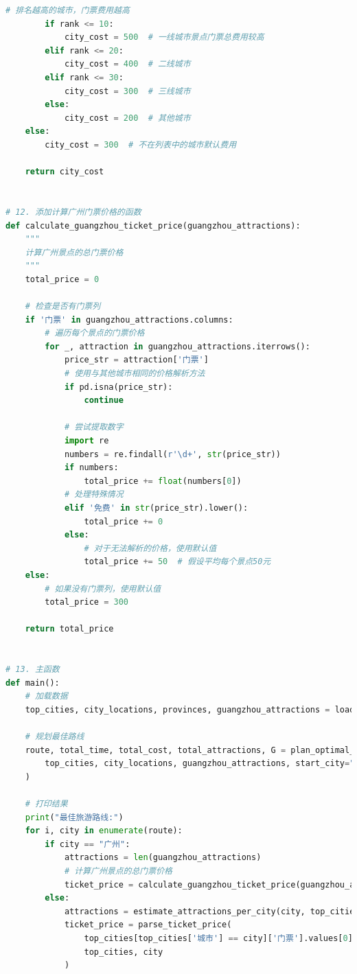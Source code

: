 \documentclass[withoutpreface,bwprint]{cumcmthesis} %
\begin{document}
\begin{appendices}
\begin{lstlisting}[language=python]
        # 排名越高的城市，门票费用越高
        if rank <= 10:
            city_cost = 500  # 一线城市景点门票总费用较高
        elif rank <= 20:
            city_cost = 400  # 二线城市
        elif rank <= 30:
            city_cost = 300  # 三线城市
        else:
            city_cost = 200  # 其他城市
    else:
        city_cost = 300  # 不在列表中的城市默认费用
    
    return city_cost


# 12. 添加计算广州门票价格的函数
def calculate_guangzhou_ticket_price(guangzhou_attractions):
    """
    计算广州景点的总门票价格
    """
    total_price = 0
    
    # 检查是否有门票列
    if '门票' in guangzhou_attractions.columns:
        # 遍历每个景点的门票价格
        for _, attraction in guangzhou_attractions.iterrows():
            price_str = attraction['门票']
            # 使用与其他城市相同的价格解析方法
            if pd.isna(price_str):
                continue
            
            # 尝试提取数字
            import re
            numbers = re.findall(r'\d+', str(price_str))
            if numbers:
                total_price += float(numbers[0])
            # 处理特殊情况
            elif '免费' in str(price_str).lower():
                total_price += 0
            else:
                # 对于无法解析的价格，使用默认值
                total_price += 50  # 假设平均每个景点50元
    else:
        # 如果没有门票列，使用默认值
        total_price = 300
    
    return total_price


# 13. 主函数
def main():
    # 加载数据
    top_cities, city_locations, provinces, guangzhou_attractions = load_data()
    
    # 规划最佳路线
    route, total_time, total_cost, total_attractions, G = plan_optimal_route(
        top_cities, city_locations, guangzhou_attractions, start_city="广州", max_hours=144
    )
    
    # 打印结果
    print("最佳旅游路线:")
    for i, city in enumerate(route):
        if city == "广州":
            attractions = len(guangzhou_attractions)
            # 计算广州景点的总门票价格
            ticket_price = calculate_guangzhou_ticket_price(guangzhou_attractions)
        else:
            attractions = estimate_attractions_per_city(city, top_cities)
            ticket_price = parse_ticket_price(
                top_cities[top_cities['城市'] == city]['门票'].values[0] if city in top_cities['城市'].values else None,
                top_cities, city
            )
            

\end{lstlisting}
\end{appendices}
\end{document}
